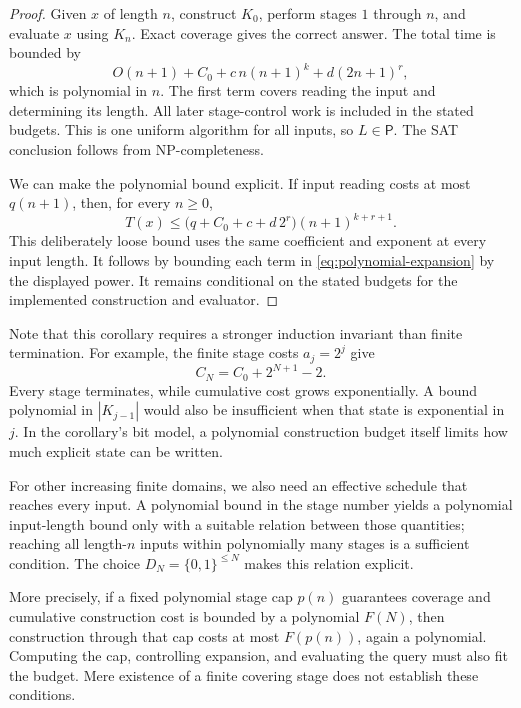\documentclass[11pt,a4paper]{article}
\numberwithin{equation}{section}
\newcommand{\Pclass}{\mathsf{P}}
\newcommand{\bits}{\{0,1\}}
\theoremstyle{plain}
\theoremstyle{definition}
\theoremstyle{remark}
\begin{document}
\begin{proof}
Given $x$ of length $n$, construct $K_0$, perform stages $1$ through $n$, and evaluate $x$ using $K_n$. Exact coverage gives the correct answer. The total time is bounded by
\begin{equation}
O(n+1)+C_0+c\,n(n+1)^k+d(2n+1)^r,
\label{eq:polynomial-expansion}
\end{equation}
which is polynomial in $n$. The first term covers reading the input and determining its length. All later stage-control work is included in the stated budgets. This is one uniform algorithm for all inputs, so $L\in\Pclass$. The SAT conclusion follows from NP-completeness.

We can make the polynomial bound explicit. If input reading costs at most $q(n+1)$, then, for every $n\geq0$,
\begin{equation}
T(x)\leq \bigl(q+C_0+c+d\,2^r\bigr)(n+1)^{k+r+1}.
\label{eq:explicit-polynomial-budget}
\end{equation}
This deliberately loose bound uses the same coefficient and exponent at every input length. It follows by bounding each term in \eqref{eq:polynomial-expansion} by the displayed power. It remains conditional on the stated budgets for the implemented construction and evaluator.
\end{proof}

Note that this corollary requires a stronger induction invariant than finite termination. For example, the finite stage costs $a_j=2^j$ give
\begin{equation}
C_N=C_0+2^{N+1}-2.
\label{eq:exponential-expansion}
\end{equation}
Every stage terminates, while cumulative cost grows exponentially. A bound polynomial in $|K_{j-1}|$ would also be insufficient when that state is exponential in $j$. In the corollary's bit model, a polynomial construction budget itself limits how much explicit state can be written.

For other increasing finite domains, we also need an effective schedule that reaches every input. A polynomial bound in the stage number yields a polynomial input-length bound only with a suitable relation between those quantities; reaching all length-$n$ inputs within polynomially many stages is a sufficient condition. The choice $D_N=\bits^{\leq N}$ makes this relation explicit.

More precisely, if a fixed polynomial stage cap $p(n)$ guarantees coverage and cumulative construction cost is bounded by a polynomial $F(N)$, then construction through that cap costs at most $F(p(n))$, again a polynomial. Computing the cap, controlling expansion, and evaluating the query must also fit the budget. Mere existence of a finite covering stage does not establish these conditions.
\end{document}
